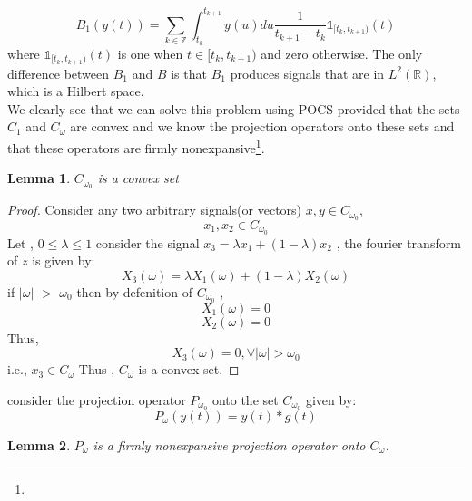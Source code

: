 \documentclass{article}
\newtheorem{lemma}{Lemma}[section]
\begin{document}
\begin{equation}
    B_1(y(t)) = \sum_{k\in\mathbb{Z}}\int_{t_k}^{t_{k+1}}y(u)du \frac{1}{t_{k+1}-t_k}\mathds{1}_{[t_k,t_{k+1})}(t)
\end{equation}
where $\mathds{1}_{[t_k,t_{k+1})}(t)$ is one when $t\in[t_k,t_{k+1})$ and zero otherwise. The only difference between $B_1$ and $B$ is that $B_1$ produces signals that are in $L^2(\mathbb{R})$, which is a Hilbert space.\\
We clearly see that we can solve this problem using POCS provided that the sets $C_1$ and $C_{\omega}$ are convex and we know the projection operators onto these sets and that these operators are firmly nonexpansive\footnote{}.

\begin{lemma}
$C_{\omega_0}$ is a convex set
\end{lemma}
\begin{proof}
Consider any two arbitrary signals(or vectors) $x,y \in C_{\omega_0}$, 
\begin{equation*}
    x_1,x_2 \in C_{\omega_0}
\end{equation*}
Let , $0 \leq \lambda \leq 1$
consider the signal $x_3 = \lambda x_1 + (1-\lambda) x_2 $ , the fourier transform of $z$ is given by:
\begin{equation*}
    X_3(\omega) = \lambda X_1(\omega) + (1-\lambda) X_2(\omega)
\end{equation*}
if $|\omega|$ $>$ $\omega_0$ then by defenition of $C_{\omega_0}$ ,
\begin{equation*}
    X_1(\omega) = 0 
\end{equation*}
\begin{equation*}
    X_2(\omega) = 0
\end{equation*}
Thus, 
\begin{equation*}
    X_3(\omega) = 0 , \forall |\omega| > \omega_0
\end{equation*}
i.e., $x_3 \in C_{\omega}$
Thus , $C_{\omega}$ is a convex set.
\end{proof}

consider the projection operator $P_{\omega_0}$ onto the set $C_{\omega_0}$ given by:
\begin{equation}
    P_{\omega}(y(t)) = y(t)*g(t) 
\end{equation}

\begin{lemma}
$P_{\omega}$ is a firmly nonexpansive projection operator onto $C_{\omega}$.
\end{lemma}
\end{document}
